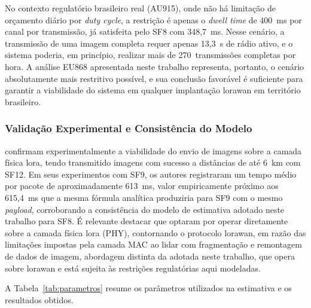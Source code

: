 No contexto regulatório brasileiro real (AU915), onde não há limitação de orçamento
diário por \textit{duty cycle}, a restrição é apenas o \textit{dwell time} de 400~ms por
canal por transmissão, já satisfeita pelo SF8 com 348,7~ms. Nesse cenário, a
transmissão de uma imagem completa requer apenas 13,3~s de rádio ativo, e o sistema
poderia, em princípio, realizar mais de 270~transmissões completas por hora. A análise
EU868 apresentada neste trabalho representa, portanto, o cenário absolutamente mais
restritivo possível, e sua conclusão favorável é suficiente para garantir a viabilidade
do sistema em qualquer implantação \gls{lorawan} em território brasileiro.
 
\subsubsection{Validação Experimental e Consistência do Modelo}
 
 confirmam experimentalmente a viabilidade do envio de imagens
sobre a camada física \gls{lora}, tendo transmitido imagens com sucesso a distâncias de até
6~km com SF12. Em seus experimentos com SF9, os autores registraram um tempo médio
por pacote de aproximadamente 613~ms, valor empiricamente próximo aos 615,4~ms
que a mesma fórmula analítica produziria para SF9 com o mesmo \textit{\gls{payload}},
corroborando a consistência do modelo de estimativa adotado neste trabalho para SF8.
É relevante destacar que  optaram por operar diretamente sobre
a camada física \gls{lora} (PHY), contornando o protocolo \gls{lorawan}, em razão das
limitações impostas pela camada MAC ao lidar com fragmentação e remontagem de dados
de imagem, abordagem distinta da adotada neste trabalho, que opera sobre \gls{lorawan}
e está sujeita às restrições regulatórias aqui modeladas.
 
A Tabela~\ref{tab:parametros} resume os parâmetros utilizados na estimativa e os
resultados obtidos.
 
